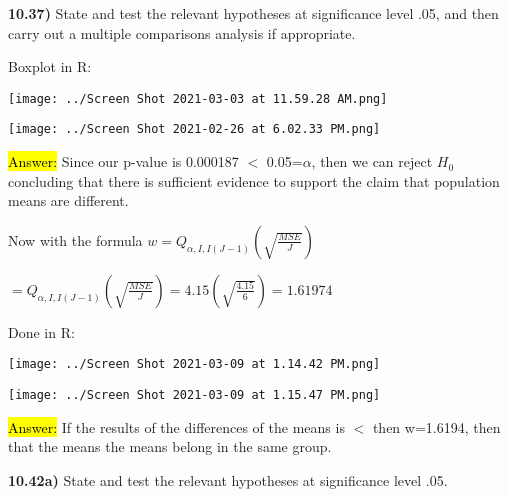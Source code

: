 \documentclass{article}
\begin{document}
\newpage
\textbf{10.37)} State and test the relevant hypotheses at significance level .05, and then carry out a multiple comparisons analysis if appropriate.

\vspace{2mm}


Boxplot in R: 


\vspace{2mm}

\texttt{[image: ../Screen Shot 2021-03-03 at 11.59.28 AM.png]}

\vspace{2mm}

\texttt{[image: ../Screen Shot 2021-02-26 at 6.02.33 PM.png]}

\vspace{2mm}

\hl{Answer:} Since our p-value is 0.000187 $<$ 0.05=$\alpha$, then we can reject $H_{0}$ concluding that there is sufficient evidence to support the claim that population means are different.

 \vspace{2mm}


Now with the formula $w=Q_{\alpha, I, I(J-1)} (\sqrt{\frac{MSE}{J}})$

\vspace{2mm}

$=Q_{\alpha, I, I(J-1)} (\sqrt{\frac{MSE}{J}})=4.15(\sqrt{\frac{4.15}{6}})=1.61974$

\vspace{2mm}

Done in R:

\texttt{[image: ../Screen Shot 2021-03-09 at 1.14.42 PM.png]}

\vspace{2mm}

\texttt{[image: ../Screen Shot 2021-03-09 at 1.15.47 PM.png]}

\vspace{2mm}

\hl{Answer:}  If the results of the differences of the means is $<$ then w=1.6194, then that the means the means belong in the same group.










\newpage
\textbf{10.42a)} State and test the relevant hypotheses at significance level .05. 
\end{document}
